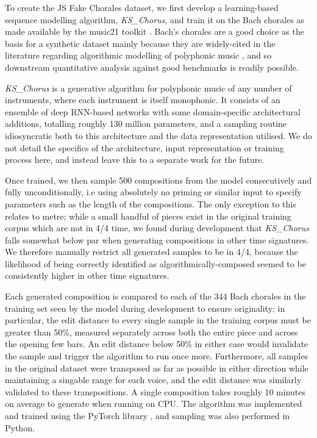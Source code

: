 \documentclass{article}
\begin{document}
To create the JS Fake Chorales dataset, we first develop a learning-based sequence modelling algorithm, \textit{KS\_Chorus}, and train it on the Bach chorales as made available by the music21 toolkit \cite{music21}. Bach's chorales are a good choice as the basis for a synthetic dataset mainly because they are widely-cited in the literature regarding algorithmic modelling of polyphonic music \cite{deepbach, bachbot, coconet, boulanger, tonicnet}, and so downstream quantitative analysis against good benchmarks is readily possible. 

\textit{KS\_Chorus} is a generative algorithm for polyphonic music of any number of instruments, where each instrument is itself monophonic. It consists of an ensemble of deep RNN-based networks with some domain-specific architectural additions, totalling roughly 130 million parameters, and a sampling routine idiosyncratic both to this architecture and the data representation utilised. We do not detail the specifics of the architecture, input representation or training process here, and instead leave this to a separate work for the future.

Once trained, we then sample 500 compositions from the model consecutively and fully unconditionally, i.e using absolutely no priming or similar input to specify parameters such as the length of the compositions. The only exception to this relates to metre; while a small handful of pieces exist in the original training corpus which are not in 4/4 time, we found during development that \textit{KS\_Chorus} falls somewhat below par when generating compositions in other time signatures. We therefore manually restrict all generated samples to be in 4/4, because the likelihood of being correctly identified as algorithmically-composed seemed to be consistently higher in other time signatures.

Each generated composition is compared to each of the 344 Bach chorales in the training set seen by the model during development to ensure originality; in particular, the edit distance to every single sample in the training corpus must be greater than 50\%, measured separately across both the entire piece and across the opening few bars. An edit distance below 50\% in either case would invalidate the sample and trigger the algorithm to run once more. Furthermore, all samples in the original dataset were transposed as far as possible in either direction while maintaining a singable range for each voice, and the edit distance was similarly validated to these transpositions. A single composition takes roughly 10 minutes on average to generate when running on CPU. The algorithm was implemented and trained using the PyTorch library \cite{pytorch}, and sampling was also performed in Python.
\end{document}
